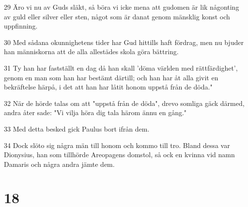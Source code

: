 \par 29 Äro vi nu av Guds släkt, så böra vi icke mena att gudomen är lik någonting av guld eller silver eller sten, något som är danat genom mänsklig konst och uppfinning.
\par 30 Med sådana okunnighetens tider har Gud hittills haft fördrag, men nu bjuder han människorna att de alla allestädes skola göra bättring.
\par 31 Ty han har fastställt en dag då han skall 'döma världen med rättfärdighet', genom en man som han har bestämt därtill; och han har åt alla givit en bekräftelse härpå, i det att han har låtit honom uppstå från de döda."
\par 32 När de hörde talas om att "uppstå från de döda", drevo somliga gäck därmed, andra åter sade: "Vi vilja höra dig tala härom ännu en gång."
\par 33 Med detta besked gick Paulus bort ifrån dem.
\par 34 Dock slöto sig några män till honom och kommo till tro. Bland dessa var Dionysius, han som tillhörde Areopagens domstol, så ock en kvinna vid namn Damaris och några andra jämte dem.

\chapter{18}

